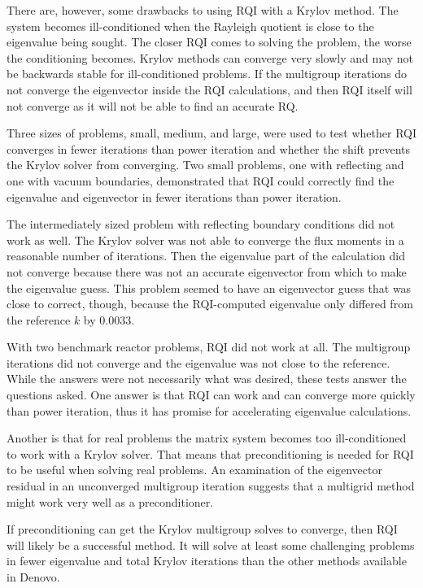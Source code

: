 There are, however, some drawbacks to using RQI with a Krylov method. The system becomes ill-conditioned when the Rayleigh quotient is close to the eigenvalue being sought. The closer RQI comes to solving the problem, the worse the conditioning becomes. Krylov methods can converge very slowly and may not be backwards stable for ill-conditioned problems. If the multigroup iterations do not converge the eigenvector inside the RQI calculations, and then RQI itself will not converge as it will not be able to find an accurate RQ.

Three sizes of problems, small, medium, and large, were used to test whether RQI converges in fewer iterations than power iteration and whether the shift prevents the Krylov solver from converging. Two small problems, one with reflecting and one with vacuum boundaries, demonstrated that RQI could correctly find the eigenvalue and eigenvector in fewer iterations than power iteration. 

The intermediately sized problem with reflecting boundary conditions did not work as well. The Krylov solver was not able to converge the flux moments in a reasonable number of iterations. Then the eigenvalue part of the calculation did not converge because there was not an accurate eigenvector from which to make the eigenvalue guess. This problem seemed to have an eigenvector guess that was close to correct, though, because the RQI-computed eigenvalue only differed from the reference $k$ by 0.0033. 

With two benchmark reactor problems, RQI did not work at all. The multigroup iterations did not converge and the eigenvalue was not close to the reference. While the answers were not necessarily what was desired, these tests answer the questions asked. One answer is that RQI can work and can converge more quickly than power iteration, thus it has promise for accelerating eigenvalue calculations. 

Another is that for real problems the matrix system becomes too ill-conditioned to work with a Krylov solver. That means that preconditioning is needed for RQI to be useful when solving real problems. An examination of the eigenvector residual in an unconverged multigroup iteration suggests that a multigrid method might work very well as a preconditioner. 

If preconditioning can get the Krylov multigroup solves to converge, then RQI will likely be a successful method. It will solve at least some challenging problems in fewer eigenvalue and total Krylov iterations than the other methods available in Denovo. 

